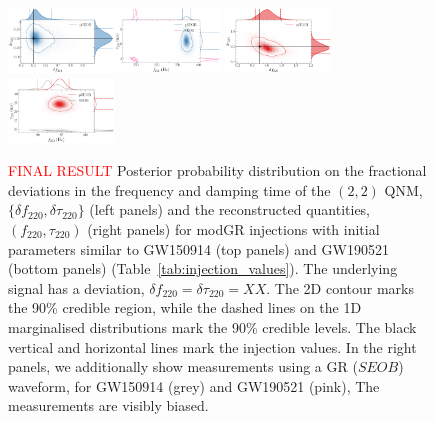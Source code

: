 \documentclass[twocolumn,prd,superscriptaddress,amsfonts,amssymb,amsmath,preprintnumbers]{revtex4-1}
\newcommand{\df}[1]{\delta f_{\text{#1}}}
\newcommand{\dtau}[1]{\delta \tau_{\text{#1}}}
\newcommand{\fngr}[1]{f_{\text{#1}}}
\newcommand{\taungr}[1]{\tau_{\text{#1}}}
\begin{document}
\begin{figure}[h!]
	\includegraphics[width=0.25\textwidth]{figures/GW150914_simulated_signal_0p5_deltaf220_deltatau220.png}\includegraphics[width=0.25\textwidth]{figures/GW150914_simulated_signal_0p5_gr_ngr_fngrtaungr.png}	
	\includegraphics[width=0.25\textwidth]{figures/GW190521_simulated_signal_0p5_deltaf220_deltatau220.png}\includegraphics[width=0.25\textwidth]{figures/GW190521_simulated_signal_0p5_gr_ngr_fngrtaungr.png}
	\caption{\textcolor{red}{FINAL RESULT} Posterior probability distribution on the fractional deviations in the frequency and damping time of the $(2,2)$ QNM, $\{\df{220},\dtau{220}\}$ (left panels) and the reconstructed quantities, $(\fngr{220}, \taungr{220})$ (right panels) for modGR injections with initial parameters similar to GW150914 (top panels) and GW190521 (bottom panels) (Table~\ref{tab:injection_values}). The underlying signal has a deviation, $\df{220} = \dtau{220} = XX$. The 2D contour marks the 90\% credible region, while the dashed lines on the 1D marginalised distributions mark the 90\% credible levels. The black vertical and horizontal lines mark the injection values. In the right panels, we additionally show measurements using a GR ($SEOB$) waveform, for GW150914 (grey) and GW190521 (pink), The measurements are visibly biased.}
	\label{fig:simulated_signal_nonGR}
\end{figure}
\end{document}
